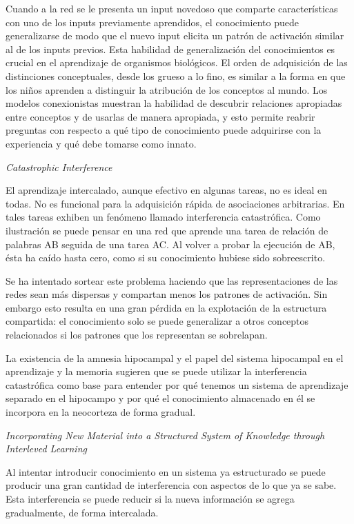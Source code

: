 \documentclass[a4paper,12pt]{article}
\begin{document}
Cuando a la red se le presenta un input novedoso que comparte características con uno de los inputs previamente aprendidos, el conocimiento puede generalizarse de modo que el nuevo input elicita un patrón de activación similar al de los inputs previos. Esta habilidad de generalización del conocimientos es crucial en el aprendizaje de organismos biológicos. El orden de adquisición de las distinciones conceptuales, desde los grueso a lo fino, es similar a la forma en que los niños aprenden a distinguir la atribución de los conceptos al mundo. Los modelos conexionistas muestran la habilidad de descubrir relaciones apropiadas entre conceptos y de usarlas de manera apropiada, y esto permite reabrir preguntas con respecto a qué tipo de conocimiento puede adquirirse con la experiencia y qué debe tomarse como innato.

{\itshape Catastrophic Interference}

El aprendizaje intercalado, aunque efectivo en algunas tareas, no es ideal en todas. No es funcional para la adquisición rápida de asociaciones arbitrarias. En tales tareas exhiben un fenómeno llamado interferencia catastrófica. Como ilustración se puede pensar en una red que aprende una tarea de relación de palabras AB seguida de una tarea AC. Al volver a probar la ejecución de AB, ésta ha caído hasta cero, como si su conocimiento hubiese sido sobreescrito.

Se ha intentado sortear este problema haciendo que las representaciones de las redes sean más dispersas y compartan menos los patrones de activación. Sin embargo esto resulta en una gran pérdida en la explotación de la estructura compartida: el conocimiento solo se puede generalizar a otros conceptos relacionados si los patrones que los representan se sobrelapan. 

La existencia de la amnesia hipocampal y el papel del sistema hipocampal en el aprendizaje y la memoria sugieren que se puede utilizar la interferencia catastrófica como base para entender por qué tenemos un sistema de aprendizaje separado en el hipocampo y por qué el conocimiento almacenado en él se incorpora en la neocorteza de forma gradual.

{\itshape Incorporating New Material into a Structured System of Knowledge through Interleved Learning}

Al intentar introducir conocimiento en un sistema ya estructurado se puede producir una gran cantidad de interferencia con aspectos de lo que ya se sabe. Esta interferencia se puede reducir si la nueva información se agrega gradualmente, de forma intercalada.
\end{document}

